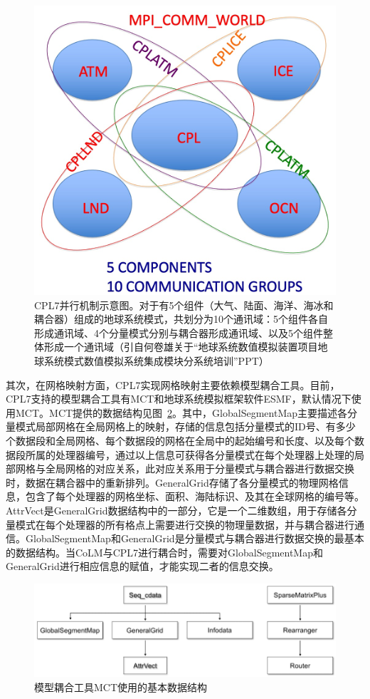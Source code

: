 {
\begin{figure}[htbp]
\centering
\includegraphics{Figures/模式构架/CPL7并行机制示意图.png}
\caption{CPL7并行机制示意图。对于有5个组件（大气、陆面、海洋、海冰和耦合器）组成的地球系统模式，共划分为10个通讯域：5个组件各自形成通讯域、4个分量模式分别与耦合器形成通讯域、以及5个组件整体形成一个通讯域（引自何卷雄关于“地球系统数值模拟装置项目地球系统模式数值模拟系统集成模块分系统培训”PPT）}
\label{fig:CPL7并行机制示意图}
\end{figure}
}

其次，在网格映射方面，CPL7实现网格映射主要依赖模型耦合工具。目前，CPL7支持的模型耦合工具有MCT和地球系统模拟框架软件ESMF，默认情况下使用MCT。MCT提供的数据结构见图~\ref{fig:MCT的基本数据结构}。其中，GlobalSegmentMap主要描述各分量模式局部网格在全局网格上的映射，存储的信息包括分量模式的ID号、有多少个数据段和全局网格、每个数据段的网格在全局中的起始编号和长度、以及每个数据段所属的处理器编号，通过以上信息可获得各分量模式在每个处理器上处理的局部网格与全局网格的对应关系，此对应关系用于分量模式与耦合器进行数据交换时，数据在耦合器中的重新排列。GeneralGrid存储了各分量模式的物理网格信息，包含了每个处理器的网格坐标、面积、海陆标识、及其在全球网格的编号等。AttrVect是GeneralGrid数据结构中的一部分，它是一个二维数组，用于存储各分量模式在每个处理器的所有格点上需要进行交换的物理量数据，并与耦合器进行通信。GlobalSegmentMap和GeneralGrid是分量模式与耦合器进行数据交换的最基本的数据结构。当CoLM与CPL7进行耦合时，需要对GlobalSegmentMap和GeneralGrid进行相应信息的赋值，才能实现二者的信息交换。

{
\begin{figure}[htbp]
\centering
\includegraphics{Figures/模式构架/MCT的基本数据结构.png}
\caption{模型耦合工具MCT使用的基本数据结构}
\label{fig:MCT的基本数据结构}
\end{figure}
}

